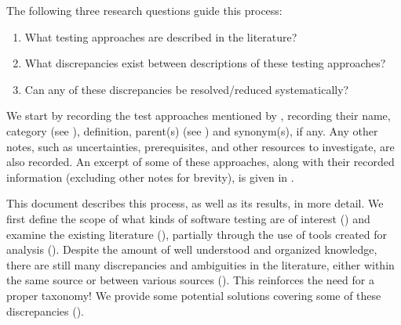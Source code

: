 \ifnotpaper
    The following three research questions guide this process:
    \begin{enumerate}
        \item What testing approaches are described in the literature?
        \item What discrepancies exist between descriptions of these testing
              approaches?
        \item Can any of these discrepancies be resolved/reduced systematically?
    \end{enumerate}
    We start by recording the \approachCount{} test approaches mentioned by
    \srcCount{} , recording their name, category (see
    ), definition, parent(s) (see )
    and synonym(s), if any. Any other notes, such as uncertainties,
    prerequisites, and other resources to investigate, are also recorded. An
    excerpt of some of these approaches, along with their recorded information
    (excluding other notes for brevity), is given in
    .
\fi

This document describes this process, as well as its results, in more detail.
We first define the scope of
what kinds of software testing are of interest () and examine the
existing literature ()\ifnotpaper, partially through the use
of tools created for analysis ()\fi. Despite the amount of well
understood and organized knowledge, there are still many discrepancies and
ambiguities in the literature, either within the same source or between various
sources (). This reinforces the need for a proper taxonomy! We
provide some potential solutions covering some of these discrepancies
().

\ifnotpaper
    \begin{bigLandscape}
        
    \end{bigLandscape}
\fi
